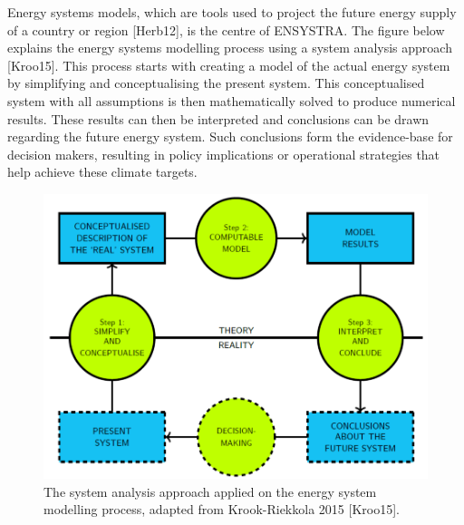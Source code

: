 Energy systems models, which are tools used to project the future energy
supply of a country or region {[}Herb12{]}, is the centre of ENSYSTRA.
The figure below explains the energy systems modelling process using a
system analysis approach {[}Kroo15{]}. This process starts with creating
a model of the actual energy system by simplifying and conceptualising
the present system. This conceptualised system with all assumptions is
then mathematically solved to produce numerical results. These results
can then be interpreted and conclusions can be drawn regarding the
future energy system. Such conclusions form the evidence-base for
decision makers, resulting in policy implications or operational
strategies that help achieve these climate targets.

\begin{figure}
\centering
\includegraphics{images/system-analysis.png}
\caption{The system analysis approach applied on the energy system
modelling process, adapted from Krook-Riekkola 2015 {[}Kroo15{]}.}
\end{figure}

